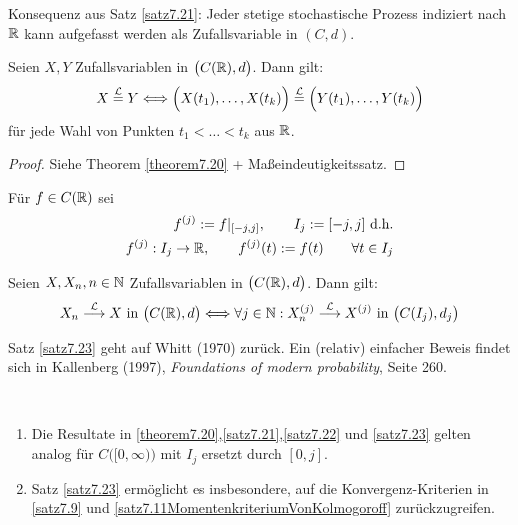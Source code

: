 Konsequenz aus Satz \ref{satz7.21}: Jeder stetige stochastische Prozess indiziert nach $\mathbb{R}$ kann aufgefasst werden als Zufallsvariable in $(C,d)$.

\begin{satz}\label{satz7.22}
	Seien $X,Y$ Zufallsvariablen in $\big(C(\mathbb{R}),d\big)$. Dann gilt:
	\begin{align*}
		X\stackrel{\mathcal{L}}{=}Y\Longleftrightarrow
		\Big(X(t_1),\ldots,X(t_k)\Big)\stackrel{\mathcal{L}}{=}\Big(Y(t_1),\ldots,Y(t_k)\Big)
	\end{align*}
	für jede Wahl von Punkten $t_1<\ldots<t_k$ aus $\mathbb{R}$.
\end{satz}

\begin{proof}
	Siehe Theorem \ref{theorem7.20} + Maßeindeutigkeitssatz.
\end{proof}

Für $f\in C(\mathbb{R})$ sei
\begin{align*}
	f^{(j)}:=f|_{[-j,j]},\qquad I_j:=[-j,j]\text{ d.h.}\\
	f^{(j)}:I_j\to\mathbb{R},\qquad f^{(j)}(t):=f(t)\qquad\forall t\in I_j
\end{align*}

\begin{satz}\label{satz7.23}
	Seien $X,X_n,n\in\mathbb{N}$ Zufallsvariablen in $\big(C(\mathbb{R}),d\big)$. Dann gilt:
	\begin{align*}
		X_n\stackrel{\mathcal{L}}{\longrightarrow}X\text{ in }\big(C(\mathbb{R}),d\big)
		\Longleftrightarrow\forall j\in\mathbb{N}:
		X_n^{(j)}\stackrel{\mathcal{L}}{\longrightarrow} X^{(j)}\text{ in }\big(C(I_j),d_j\big)
	\end{align*}
\end{satz}

Satz \ref{satz7.23} geht auf Whitt (1970) zurück. Ein (relativ) einfacher Beweis findet sich in Kallenberg (1997), \textit{Foundations of modern probability}, Seite 260.

\begin{bemerkungnr}\label{bemerkung7.24}\
	\begin{enumerate}[label=(\arabic*)]
		\item Die Resultate in \ref{theorem7.20},\ref{satz7.21},\ref{satz7.22} und \ref{satz7.23} gelten analog für $C\big([0,\infty)\big)$ mit $I_j$ ersetzt durch $[0,j]$.
		\item Satz \ref{satz7.23} ermöglicht es insbesondere, auf die Konvergenz-Kriterien in \ref{satz7.9} und \ref{satz7.11MomentenkriteriumVonKolmogoroff} zurückzugreifen.
	\end{enumerate}
\end{bemerkungnr}


